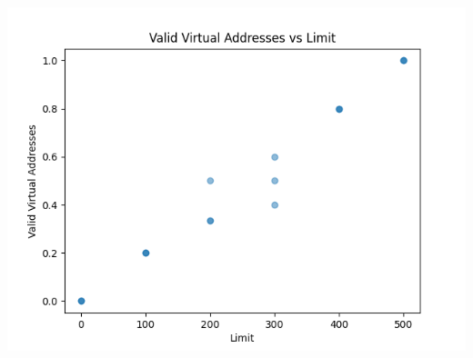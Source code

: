\documentclass[12pt]{article}
\begin{document}
\begin{enumerate}[1.]
    \begin{center}
    \includegraphics[width=0.8\linewidth]{images/worksheet_7_solution_8.png}
    \end{center}


\end{enumerate}
\end{document}
